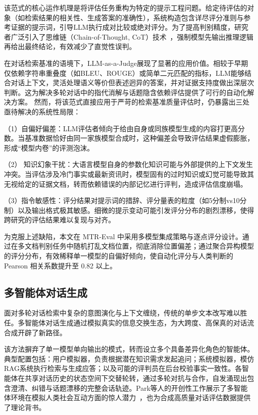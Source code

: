 该范式的核心运作机理是将评估任务重构为特定的提示工程问题。给定待评估的对象（如检索结果的相关性、生成答案的准确性），系统构造包含详尽评分准则与参考证据的提示词，引导LLM执行成对比较或绝对评分。为了提高判别精度，研究者广泛引入了思维链（Chain-of-Thought, CoT）技术~\citep{wei2022chain}，强制模型先输出推理逻辑再给出最终结论，有效减少了直觉性误判。

在对话检索基准的语境下，LLM-as-a-Judge展现了显著的应用价值。相较于早期仅依赖字符串重叠度（如BLEU、ROUGE）或简单二元匹配的指标，LLM能够结合对话上下文，灵活处理语义等价但表述迥异的答案，并对证据支持度做出深层次判断。这为解决多轮对话中的指代消解与话题隐含依赖评估提供了可行的自动化解决方案。
然而，将该范式直接应用于严苛的检索基准质量评估时，仍暴露出三处亟待解决的系统性局限：

（1）自偏好偏差：LLM评估者倾向于给由自身或同族模型生成的内容打更高分数。当基准数据恰好由同一家族模型合成时，这种偏差会导致评估结果虚假膨胀，形成“模型内卷”的评测泡沫。

（2） 知识幻象干扰：大语言模型自身的参数化知识可能与外部提供的上下文发生冲突。当评估涉及冷门事实或最新资讯时，模型固有的过时知识或幻觉可能导致其无视给定的证据文档，转而依赖错误的内部记忆进行评判，造成评估信度崩塌。

（3）指令敏感性：评分结果对提示词的措辞、评分量表的粒度（如5分制vs10分制）以及输出格式极其敏感。细微的提示变动可能引发评分分布的剧烈漂移，使得跨研究的评估结果难以复现与对齐。

为克服上述缺陷，本文在 MTR-Eval 中采用多模型集成策略与逐点评分设计。通过在多文档判别任务中随机打乱文档位置，彻底消除位置偏差；通过聚合异构模型的评分分布，有效稀释单一模型的自偏好倾向，使自动化评分与人类判断的 Pearson 相关系数提升至 0.82 以上。


\subsection{多智能体对话生成}
面对多轮对话检索中复杂的意图演化与上下文缠绕，传统的单步文本改写难以胜任。多智能体对话生成通过模拟真实的信息交换生态，为大跨度、高保真的对话流合成开辟了新路径。

该方法摒弃了单一模型单向输出的模式，转而设立多个具备差异化角色的智能体。典型配置包括：用户模拟器，负责根据潜在知识需求发起追问；系统模拟器，模仿RAG系统执行检索与生成应答；以及可能的评判员在后台校验事实一致性。各智能体在共享对话历史的状态空间下交替轮转，通过多轮对抗与合作，自发涌现出包含澄清、纠错与话题漂移的完整会话轨迹。Park等人的开创性工作展示了多智能体环境在模拟人类社会互动方面的惊人潜力~\citep{Park2023GenerativeAI}，也为合成高质量对话评估数据提供了理论背书。

